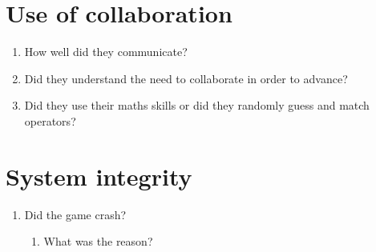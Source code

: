 \section{Use of collaboration}
\begin{enumerate}

\item How well did they communicate?

\item Did they understand the need to collaborate in order to advance?

\item Did they use their maths skills or did they randomly guess and match operators?

\end{enumerate}

\section{System integrity}
\begin{enumerate}

\item Did the game crash?

\begin{enumerate}
    \item What was the reason?
\end{enumerate}

\end{enumerate}

